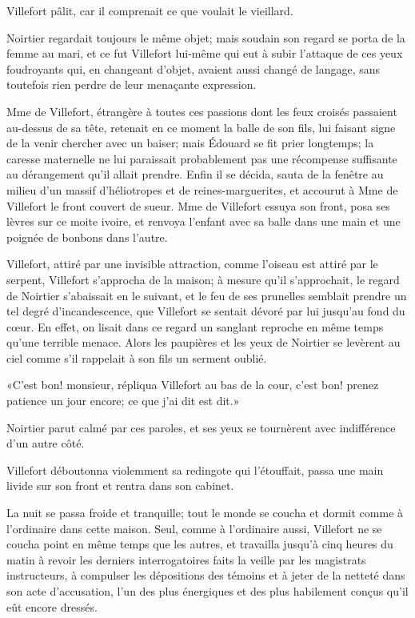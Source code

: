 Villefort pâlit, car il comprenait ce que voulait le vieillard. 

Noirtier regardait toujours le même objet; mais soudain son regard se porta de la femme au mari, et ce fut Villefort lui-même qui eut à subir l'attaque de ces yeux foudroyants qui, en changeant d'objet, avaient aussi changé de langage, sans toutefois rien perdre de leur menaçante expression. 

Mme de Villefort, étrangère à toutes ces passions dont les feux croisés passaient au-dessus de sa tête, retenait en ce moment la balle de son fils, lui faisant signe de la venir chercher avec un baiser; mais Édouard se fit prier longtemps; la caresse maternelle ne lui paraissait probablement pas une récompense suffisante au dérangement qu'il allait prendre. Enfin il se décida, sauta de la fenêtre au milieu d'un massif d'héliotropes et de reines-marguerites, et accourut à Mme de Villefort le front couvert de sueur. Mme de Villefort essuya son front, posa ses lèvres sur ce moite ivoire, et renvoya l'enfant avec sa balle dans une main et une poignée de bonbons dans l'autre. 

Villefort, attiré par une invisible attraction, comme l'oiseau est attiré par le serpent, Villefort s'approcha de la maison; à mesure qu'il s'approchait, le regard de Noirtier s'abaissait en le suivant, et le feu de ses prunelles semblait prendre un tel degré d'incandescence, que Villefort se sentait dévoré par lui jusqu'au fond du cœur. En effet, on lisait dans ce regard un sanglant reproche en même temps qu'une terrible menace. Alors les paupières et les yeux de Noirtier se levèrent au ciel comme s'il rappelait à son fils un serment oublié. 

«C'est bon! monsieur, répliqua Villefort au bas de la cour, c'est bon! prenez patience un jour encore; ce que j'ai dit est dit.» 

Noirtier parut calmé par ces paroles, et ses yeux se tournèrent avec indifférence d'un autre côté. 

Villefort déboutonna violemment sa redingote qui l'étouffait, passa une main livide sur son front et rentra dans son cabinet. 

La nuit se passa froide et tranquille; tout le monde se coucha et dormit comme à l'ordinaire dans cette maison. Seul, comme à l'ordinaire aussi, Villefort ne se coucha point en même temps que les autres, et travailla jusqu'à cinq heures du matin à revoir les derniers interrogatoires faits la veille par les magistrats instructeurs, à compulser les dépositions des témoins et à jeter de la netteté dans son acte d'accusation, l'un des plus énergiques et des plus habilement conçus qu'il eût encore dressés. 

